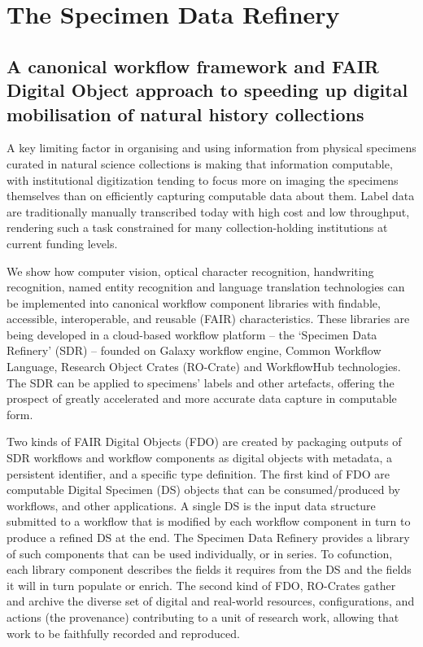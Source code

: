 \section{The Specimen Data Refinery}
\label{ch8:the-specimen-data-refinery}

\subsection*{A canonical workflow framework and FAIR Digital Object
approach to speeding up digital mobilisation of natural history
collections}

A key limiting factor in organising and using information from physical
specimens curated in natural science collections is making that
information computable, with institutional digitization tending to focus
more on imaging the specimens themselves than on efficiently capturing
computable data about them. Label data are traditionally manually
transcribed today with high cost and low throughput, rendering such a
task constrained for many collection-holding institutions at current
funding levels.

We show how computer vision, optical character recognition, handwriting
recognition, named entity recognition and language translation
technologies can be implemented into canonical workflow component
libraries with findable, accessible, interoperable, and reusable (FAIR)
characteristics. These libraries are being developed in a cloud-based
workflow platform -- the `Specimen Data Refinery' (SDR) -- founded on
Galaxy workflow engine, Common Workflow Language, Research Object Crates
(RO-Crate) and WorkflowHub technologies. The SDR can be applied to
specimens' labels and other artefacts, offering the prospect of greatly
accelerated and more accurate data capture in computable form.

Two kinds of FAIR Digital Objects (FDO) are created by packaging outputs
of SDR workflows and workflow components as digital objects with
metadata, a persistent identifier, and a specific type definition. The
first kind of FDO are computable Digital Specimen (DS) objects that can
be consumed/produced by workflows, and other applications. A single DS
is the input data structure submitted to a workflow that is modified by
each workflow component in turn to produce a refined DS at the end. The
Specimen Data Refinery provides a library of such components that can be
used individually, or in series. To cofunction, each library component
describes the fields it requires from the DS and the fields it will in
turn populate or enrich. The second kind of FDO, RO-Crates gather and
archive the diverse set of digital and real-world resources,
configurations, and actions (the provenance) contributing to a unit of
research work, allowing that work to be faithfully recorded and
reproduced.

